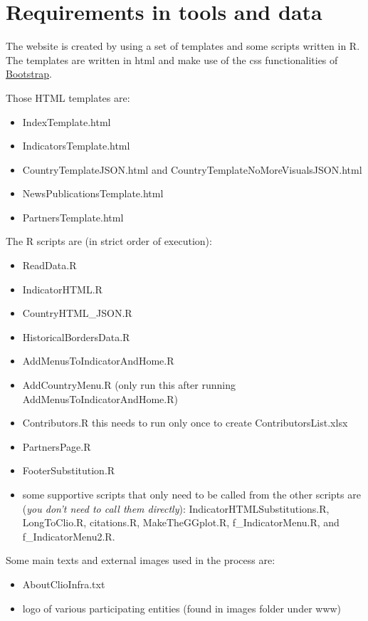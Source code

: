\documentclass[a4paper]{article}
\begin{document}
\clearpage

\section{Requirements in tools and data}\label{sec:req}

The website is created by using a set of templates and some scripts written in 
R. The templates are written in html and make use of the css functionalities of 
\href{http://getbootstrap.com/}{Bootstrap}. 

Those HTML templates are:
\begin{itemize}
 \item IndexTemplate.html
 \item IndicatorsTemplate.html
 \item CountryTemplateJSON.html and CountryTemplateNoMoreVisualsJSON.html
 \item NewsPublicationsTemplate.html
 \item PartnersTemplate.html
\end{itemize}

The R scripts are (in strict order of execution):
\begin{itemize}
 \item ReadData.R
 \item IndicatorHTML.R
 \item CountryHTML\_JSON.R
 \item HistoricalBordersData.R
 \item AddMenusToIndicatorAndHome.R
 \item AddCountryMenu.R (only run this after running 
AddMenusToIndicatorAndHome.R)
 \item Contributors.R this needs to run only once to create 
ContributorsList.xlsx
 \item PartnersPage.R
 \item FooterSubstitution.R
 \item some supportive scripts that only need to be called from the other 
scripts are (\textit{you don't need to call them directly}): 
IndicatorHTMLSubstitutions.R, LongToClio.R, citations.R, MakeTheGGplot.R, 
f\_IndicatorMenu.R, and f\_IndicatorMenu2.R.
\end{itemize}

Some main texts and external images used in the process are:
\begin{itemize}
 \item AboutClioInfra.txt
 \item logo of various participating entities (found in images folder under www)
\end{itemize}
\end{document}
